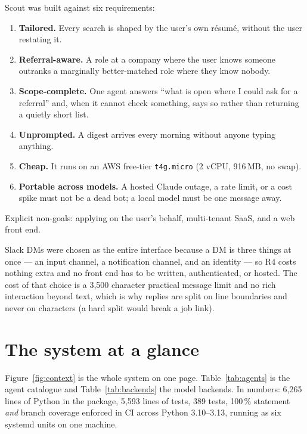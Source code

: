 \documentclass[11pt,a4paper]{article}
\begin{document}
Scout was built against six requirements:

\begin{enumerate}[label=\textbf{R\arabic*.},leftmargin=2.4em]
  \item \textbf{Tailored.} Every search is shaped by the user's own résumé, without the
    user restating it.
  \item \textbf{Referral-aware.} A role at a company where the user knows someone outranks
    a marginally better-matched role where they know nobody.
  \item \textbf{Scope-complete.} One agent answers ``what is open where I could ask for a
    referral'' and, when it cannot check something, says so rather than returning a
    quietly short list.
  \item \textbf{Unprompted.} A digest arrives every morning without anyone typing anything.
  \item \textbf{Cheap.} It runs on an AWS free-tier \texttt{t4g.micro} (2 vCPU, 916\,MB, no
    swap).
  \item \textbf{Portable across models.} A hosted Claude outage, a rate limit, or a cost
    spike must not be a dead bot; a local model must be one message away.
\end{enumerate}

Explicit non-goals: applying on the user's behalf, multi-tenant SaaS, and a web front end.

Slack DMs were chosen as the entire interface because a DM is three things at once --- an
input channel, a notification channel, and an identity --- so R4 costs nothing extra and no
front end has to be written, authenticated, or hosted. The cost of that choice is a 3{,}500
character practical message limit and no rich interaction beyond text, which is why replies
are split on line boundaries and never on characters (a hard split would break a job link).

\section{The system at a glance}

Figure~\ref{fig:context} is the whole system on one page. Table~\ref{tab:agents} is the
agent catalogue and Table~\ref{tab:backends} the model backends. In numbers: 6{,}265 lines
of Python in the package, 5{,}593 lines of tests, 389 tests, 100\,\% statement \emph{and}
branch coverage enforced in CI across Python 3.10--3.13, running as six systemd units on
one machine.
\end{document}

